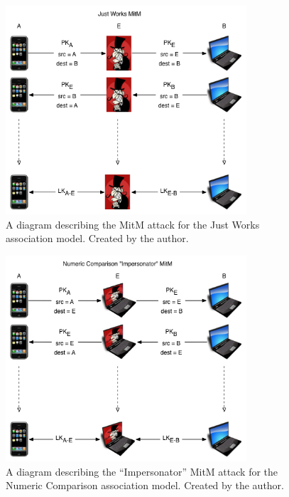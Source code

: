 \documentclass{acm_proc_article-sp}
\begin{document}
\begin{figure}
    \begin{center}
        \includegraphics[width=0.8\textwidth]{diagrams/jw_mitm.png}
        \caption{A diagram describing the MitM attack for the Just Works association model. Created by the author.}
        \label{jw_mitm}
    \end{center}
\end{figure}

\begin{figure}
    \begin{center}
        \includegraphics[width=0.8\textwidth]{diagrams/nc_impersonator_mitm.png}
        \caption{A diagram describing the ``Impersonator'' MitM attack for the Numeric Comparison association model. Created by the author.}
        \label{nc_impersonator_mitm}
    \end{center}
\end{figure}
\end{document}
